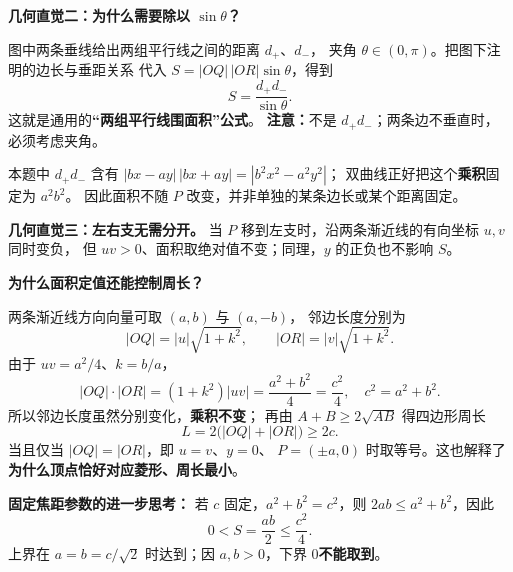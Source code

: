 \clearpage
\begin{explanationbox}
\textbf{几何直觉二：为什么需要除以 $\sin\theta$？}

\begin{center}

\end{center}

图中两条垂线给出两组平行线之间的距离 $d_+$、$d_-$，
夹角 $\theta\in(0,\pi)$。把图下注明的边长与垂距关系
代入 $S=|OQ|\,|OR|\sin\theta$，得到
\[
\boxed{S=\frac{d_+d_-}{\sin\theta}}.
\]
这就是通用的\textbf{“两组平行线围面积”公式}。
\textbf{注意：}不是 $d_+d_-$；两条边不垂直时，必须考虑夹角。

本题中 $d_+d_-$ 含有
$|bx-ay|\,|bx+ay|=|b^2x^2-a^2y^2|$；
双曲线正好把这个\textbf{乘积}固定为 $a^2b^2$。
因此面积不随 $P$ 改变，并非单独的某条边长或某个距离固定。

\textbf{几何直觉三：左右支无需分开。}
当 $P$ 移到左支时，沿两条渐近线的有向坐标 $u,v$ 同时变负，
但 $uv>0$、面积取绝对值不变；同理，$y$ 的正负也不影响 $S$。
\end{explanationbox}


\clearpage
\begin{explanationbox}
\textbf{为什么面积定值还能控制周长？}

两条渐近线方向向量可取 $(a,b)$ 与 $(a,-b)$，
邻边长度分别为
\[
|OQ|=|u|\sqrt{1+k^2},\qquad |OR|=|v|\sqrt{1+k^2}.
\]
由于 $uv=a^2/4$、$k=b/a$，
\[
\boxed{|OQ|\cdot|OR|=(1+k^2)|uv|=\frac{a^2+b^2}{4}
=\frac{c^2}{4}},\quad c^2=a^2+b^2.
\]
所以邻边长度虽然分别变化，\textbf{乘积不变}；
再由 $A+B\ge2\sqrt{AB}$ 得四边形周长
\[
L=2\bigl(|OQ|+|OR|\bigr)\ge2c.
\]
当且仅当 $|OQ|=|OR|$，即 $u=v$、$y=0$、
$P=(\pm a,0)$ 时取等号。这也解释了\textbf{为什么顶点恰好对应菱形、周长最小}。

\textbf{固定焦距参数的进一步思考：}
若 $c$ 固定，$a^2+b^2=c^2$，则 $2ab\le a^2+b^2$，因此
\[
0<S=\frac{ab}{2}\le\boxed{\frac{c^2}{4}}.
\]
上界在 $a=b=c/\sqrt2$ 时达到；因 $a,b>0$，下界 $0$\textbf{不能取到}。
\end{explanationbox}
